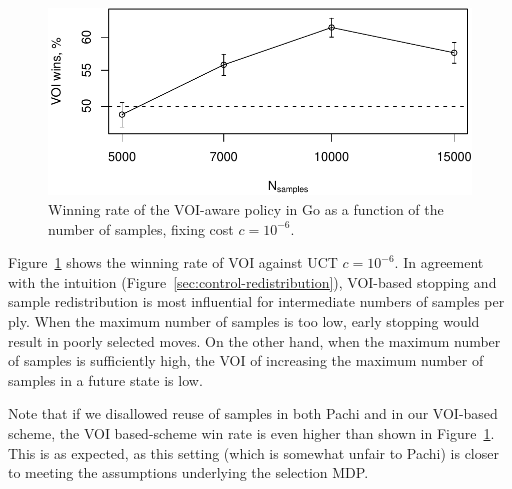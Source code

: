 \begin{figure}[h!]
\centering
\includegraphics[scale=0.55]{mcts-voi-wins.pdf}
\caption{Winning rate of the VOI-aware policy in Go as a function of the number of samples, fixing cost $c=10^{-6}$.}
\label{fig:voi-wins}
\end{figure}

Figure~\ref{fig:voi-wins}
shows the winning rate of VOI against UCT $c=10^{-6}$. In agreement with the intuition
(Figure~\ref{sec:control-redistribution}), VOI-based stopping and
sample redistribution is most influential for intermediate numbers of
samples per ply. When the maximum number of samples is too low, early
stopping would result in poorly selected moves. On the other hand,
when the maximum number of samples is sufficiently high, the VOI of
increasing the maximum number of samples in a future state is low.

Note that if we disallowed reuse of samples in both Pachi and
in our VOI-based scheme, the VOI based-scheme
win rate is even higher than shown in Figure~\ref{fig:voi-wins}. This is as expected,
as this setting (which is somewhat unfair to Pachi) is closer to
meeting the assumptions underlying the selection MDP.


